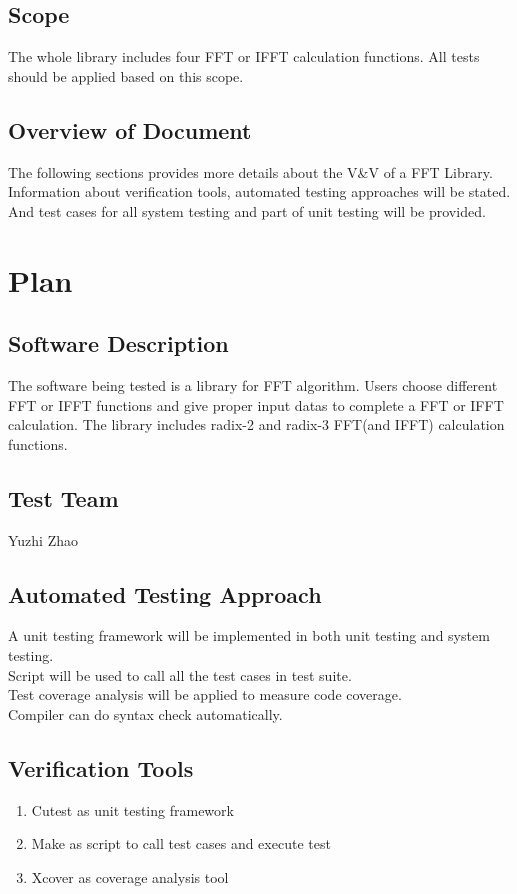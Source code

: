 \documentclass[12pt, titlepage]{article}
\begin{document}
\subsection{Scope}
The whole library includes four FFT or IFFT calculation functions. All tests should be applied based on this scope.

\subsection{Overview of Document}
The following sections provides more details about the V\&V of a FFT Library. Information about verification tools, automated testing approaches will be stated. And
test cases for all system testing and part of unit testing will be provided.
\section{Plan}
	
\subsection{Software Description}
The software being tested is a library for FFT algorithm. Users choose different  FFT or IFFT functions and give proper input datas to complete a FFT or IFFT calculation. 
The library includes radix-2 and radix-3 FFT(and IFFT) calculation functions.
\subsection{Test Team}
Yuzhi Zhao

\subsection{Automated Testing Approach}
A unit testing framework will be implemented in both unit testing and system testing.\\
Script will be used to call all the test cases in test suite.\\
Test coverage analysis will be applied to measure code coverage.\\
Compiler can do syntax check automatically.

\subsection{Verification Tools}
\begin{enumerate}
\item {{\large Cutest} as unit testing framework}
\item {{\large Make} as script to call test cases and execute test}
\item {{\large Xcover} as coverage analysis tool}
\end{enumerate}
\end{document}
